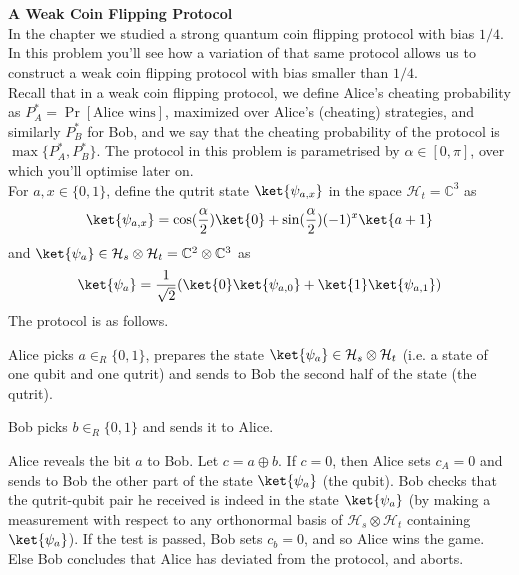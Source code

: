 \chapter{}
\begin{exercises}


\item {\bf A Weak Coin Flipping Protocol}\\
In the chapter we studied a strong quantum coin flipping protocol with bias $1/4$. In this problem you'll see how a variation of that same protocol allows us to construct a weak coin flipping protocol with bias smaller than $1/4$.  \\
Recall that in a weak coin flipping protocol, we define Alice's cheating probability as $P_A^*= \Pr[\mbox{Alice wins}]$, maximized over Alice's (cheating) strategies, and similarly $P_B^*$ for Bob, and we say that the cheating probability of the protocol is $\max \{P_A^*,P_B^*\}$. The protocol in this problem is parametrised by $\alpha \in [0,\pi]$, over which you'll optimise later on. \\
For $a,x \in \{0, 1\}$, define the qutrit state $\ket{\psi_{a,x}} $ in the space $\mathcal{H}_t = \mathbb{C}^3$ as
\begin{equation*}
\ket{\psi_{a,x}} = \cos(\frac{\alpha}{2}) \ket{0} + \sin(\frac{\alpha}{2}) (-1)^x \ket{a+1}
\end{equation*}
and $\ket{\psi_{a}} \in \mathcal{H}_s \otimes \mathcal{H}_t = \mathbb{C}^2 \otimes \mathbb{C}^3$ as
\begin{equation*}
\ket{\psi_{a}} = \frac{1}{\sqrt{2}}(\ket{0} \ket{\psi_{a,0}} + \ket{1} \ket{\psi_{a,1}} )
\end{equation*}
%
The protocol is as follows.
\begin{protocolEnumerate}
\item Alice picks $a \in_R \{0, 1\}$, prepares the state $\ket{\psi_{a}} \in \mathcal{H}_s \otimes \mathcal{H}_t$ (i.e. a state of one qubit and one qutrit) and sends to Bob the second half of the state (the qutrit).
\item Bob picks $b \in_R \{0, 1\}$ and sends it to Alice.
\item Alice reveals the bit $a$ to Bob. Let $c = a \oplus b$. If $c = 0$, then Alice sets $c_A = 0$ and sends to Bob the other part of the state $\ket{\psi_{a}}$ (the qubit). Bob checks that the qutrit-qubit pair he received is indeed in the state $\ket{\psi_{a}}$ (by making a measurement with respect to any orthonormal basis of $\mathcal{H}_s \otimes \mathcal{H}_t$ containing $\ket{\psi_{a}}$). If the test is passed, Bob sets $c_b = 0$, and so Alice wins the game. Else Bob concludes that Alice has deviated from the protocol, and aborts.

\end{protocolEnumerate}
\end{exercises}
